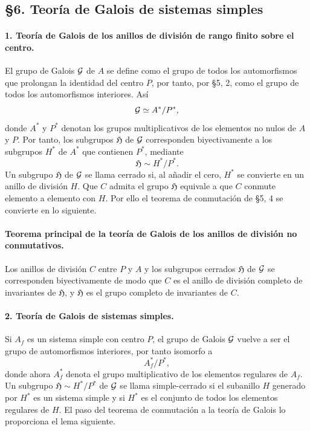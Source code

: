 \subsection*{§6. Teoría de Galois de sistemas simples}

\paragraph{1. Teoría de Galois de los anillos de división de rango finito sobre el centro.}
El grupo de Galois \(\mathcal G\) de \(A\) se define como el grupo de todos los automorfismos que prolongan la identidad del centro \(P\), por tanto, por §5, 2, como el grupo de todos los automorfismos interiores. Así
\[
        \mathcal G \simeq A^*/P^*,
\]
donde \(A^*\) y \(P^*\) denotan los grupos multiplicativos de los elementos no nulos de \(A\) y \(P\). Por tanto, los subgrupos \(\mathfrak H\) de \(\mathcal G\) corresponden biyectivamente a los subgrupos \(H^*\) de \(A^*\) que contienen \(P^*\), mediante
\[
        \mathfrak H\sim H^*/P^* .
\]
Un subgrupo \(\mathfrak H\) de \(\mathcal G\) se llama cerrado si, al añadir el cero, \(H^*\) se convierte en un anillo de división \(H\). Que \(C\) admita el grupo \(\mathfrak H\) equivale a que \(C\) conmute elemento a elemento con \(H\). Por ello el teorema de conmutación de §5, 4 se convierte en lo siguiente.

\paragraph{Teorema principal de la teoría de Galois de los anillos de división no conmutativos.}
Los anillos de división \(C\) entre \(P\) y \(A\) y los subgrupos cerrados \(\mathfrak H\) de \(\mathcal G\) se corresponden biyectivamente de modo que \(C\) es el anillo de división completo de invariantes de \(\mathfrak H\), y \(\mathfrak H\) es el grupo completo de invariantes de \(C\).

\paragraph{2. Teoría de Galois de sistemas simples.}
Si \(A_f\) es un sistema simple con centro \(P\), el grupo de Galois \(\mathcal G\) vuelve a ser el grupo de automorfismos interiores, por tanto isomorfo a
\[
        A_f^*/P^*,
\]
donde ahora \(A_f^*\) denota el grupo multiplicativo de los elementos regulares de \(A_f\). Un subgrupo \(\mathfrak H\sim H^*/P^*\) de \(\mathcal G\) se llama simple-cerrado si el subanillo \(H\) generado por \(H^*\) es un sistema simple y si \(H^*\) es el conjunto de todos los elementos regulares de \(H\). El paso del teorema de conmutación a la teoría de Galois lo proporciona el lema siguiente.

